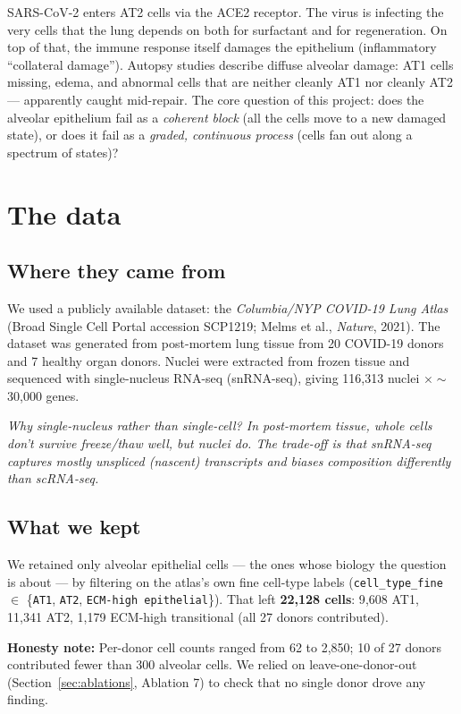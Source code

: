 \documentclass[11pt]{article}
\newcommand{\note}[1]{{\color{note}\textit{#1}}}
\newcommand{\honest}[1]{\textcolor{red!70!black}{\textbf{Honesty note:} #1}}
\begin{document}
SARS-CoV-2 enters AT2 cells via the ACE2 receptor. The virus is infecting the very cells that the lung depends on both for surfactant and for regeneration. On top of that, the immune response itself damages the epithelium (inflammatory ``collateral damage''). Autopsy studies describe diffuse alveolar damage: AT1 cells missing, edema, and abnormal cells that are neither cleanly AT1 nor cleanly AT2 --- apparently caught mid-repair. The core question of this project: does the alveolar epithelium fail as a \emph{coherent block} (all the cells move to a new damaged state), or does it fail as a \emph{graded, continuous process} (cells fan out along a spectrum of states)?

\section{The data}

\subsection{Where they came from}

We used a publicly available dataset: the \emph{Columbia/NYP COVID-19 Lung Atlas} (Broad Single Cell Portal accession SCP1219; Melms et al., \textit{Nature}, 2021). The dataset was generated from post-mortem lung tissue from 20 COVID-19 donors and 7 healthy organ donors. Nuclei were extracted from frozen tissue and sequenced with single-nucleus RNA-seq (snRNA-seq), giving 116{,}313 nuclei $\times\sim$30{,}000 genes.

\note{Why single-\emph{nucleus} rather than single-\emph{cell}? In post-mortem tissue, whole cells don't survive freeze/thaw well, but nuclei do. The trade-off is that snRNA-seq captures mostly unspliced (nascent) transcripts and biases composition differently than scRNA-seq.}

\subsection{What we kept}

We retained only alveolar epithelial cells --- the ones whose biology the question is about --- by filtering on the atlas's own fine cell-type labels (\texttt{cell\_type\_fine} $\in$ \{\texttt{AT1}, \texttt{AT2}, \texttt{ECM-high epithelial}\}). That left \textbf{22{,}128 cells}: 9{,}608 AT1, 11{,}341 AT2, 1{,}179 ECM-high transitional (all 27 donors contributed).

\honest{Per-donor cell counts ranged from 62 to 2{,}850; 10 of 27 donors contributed fewer than 300 alveolar cells. We relied on leave-one-donor-out (Section~\ref{sec:ablations}, Ablation 7) to check that no single donor drove any finding.}
\end{document}
